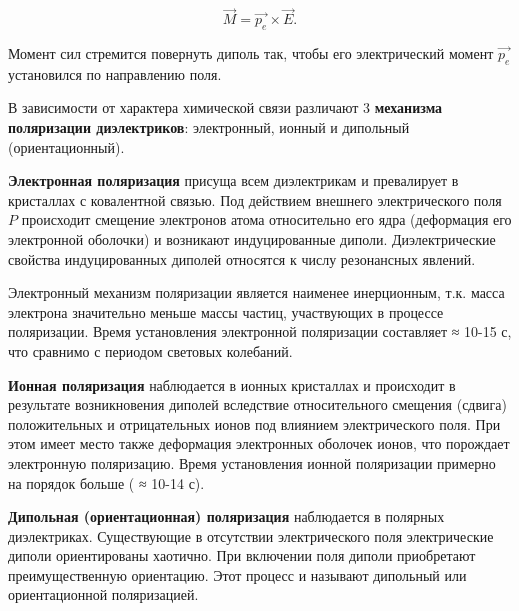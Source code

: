 \documentclass[__main__.tex]{subfiles}
\begin{document}
\begin{equation}
\vec{M} = \vec{p_e} \times \vec{E}.
\end{equation}

Момент сил стремится повернуть диполь так, чтобы его электрический момент $\vec{p_e}$ установился по направлению поля.

В зависимости от характера химической связи различают 3 \textbf{механизма поляризации диэлектриков}: электронный, ионный и дипольный (ориентационный).

\textbf{Электронная поляризация} присуща всем диэлектрикам и превалирует в кристаллах с ковалентной связью. Под действием внешнего электрического поля $P$ происходит смещение электронов атома относительно его ядра (деформация его электронной оболочки) и возникают индуцированные диполи. Диэлектрические свойства индуцированных диполей относятся к числу резонансных явлений.

Электронный механизм поляризации является наименее инерционным, т.к. масса электрона значительно меньше массы частиц, участвующих в процессе поляризации. Время установления электронной поляризации составляет ≈ 10-15 с, что сравнимо с периодом световых колебаний.

\textbf{Ионная поляризация} наблюдается в ионных кристаллах и происходит в результате возникновения диполей вследствие относительного смещения (сдвига) положительных и отрицательных ионов под влиянием электрического поля. При этом имеет место также деформация электронных оболочек ионов, что порождает электронную поляризацию. Время установления ионной поляризации примерно на порядок больше ( ≈ 10-14 с).

\textbf{Дипольная (ориентационная) поляризация} наблюдается в полярных диэлектриках. Существующие в отсутствии электрического поля электрические диполи ориентированы хаотично. При включении поля диполи приобретают преимущественную ориентацию. Этот процесс и называют дипольный или ориентационной поляризацией.
\end{document}
